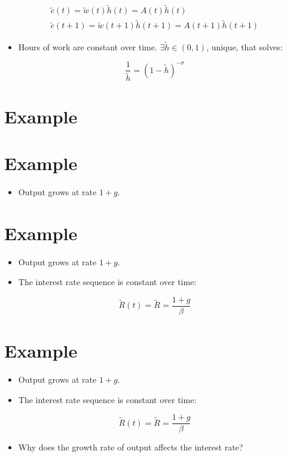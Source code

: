 \documentclass[10pt]{article}
\begin{document}
$$
\begin{gathered}
\tilde{c}(t)=\tilde{w}(t) \tilde{h}(t)=A(t) \tilde{h}(t) \\
\tilde{c}(t+1)=\tilde{w}(t+1) \tilde{h}(t+1)=A(t+1) \tilde{h}(t+1)
\end{gathered}
$$

\begin{itemize}
  \item Hours of work are constant over time. $\exists \tilde{h} \in(0,1)$, unique, that solves:
\end{itemize}

$$
\frac{1}{\tilde{h}}=(1-\tilde{h})^{-\sigma}
$$

\section*{Example}
\section*{Example}
\begin{itemize}
  \item Output grows at rate $1+g$.
\end{itemize}

\section*{Example}
\begin{itemize}
  \item Output grows at rate $1+g$.
  \item The interest rate sequence is constant over time:
\end{itemize}

$$
\tilde{R}(t)=\tilde{R}=\frac{1+g}{\beta}
$$

\section*{Example}
\begin{itemize}
  \item Output grows at rate $1+g$.
  \item The interest rate sequence is constant over time:
\end{itemize}

$$
\tilde{R}(t)=\tilde{R}=\frac{1+g}{\beta}
$$

\begin{itemize}
  \item Why does the growth rate of output affects the interest rate?
\end{itemize}
\end{document}
